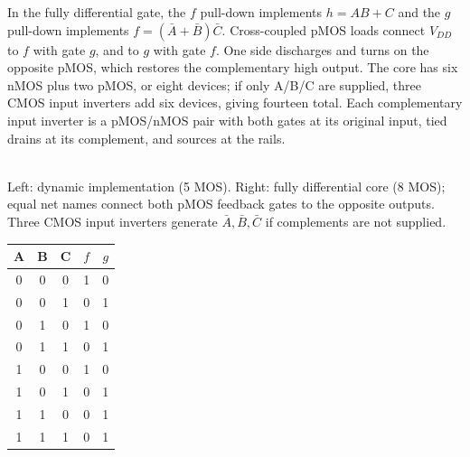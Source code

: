 \documentclass[10pt]{article}
\newcommand{\mos}[4]{\begin{scope}[shift={(#1,#2)}]
\draw(0,.24)--(0,-.24);\draw(0,.2)--(.25,.2)--(.25,.5);\draw(0,-.2)--(.25,-.2)--(.25,-.5);
\draw(-.16,.23)--(-.16,-.23);
\ifnum#4=1\draw(-.26,0)circle(.06);\draw(-.75,0)--(-.32,0);\else\draw(-.75,0)--(-.16,0);\fi
\node[anchor=east,font=\scriptsize]at(-.76,0){$#3$};\end{scope}}
\newcommand{\gnd}[2]{\draw(#1,#2)--(#1,{#2-.12});\draw({#1-.17},{#2-.12})--({#1+.17},{#2-.12});\draw({#1-.11},{#2-.2})--({#1+.11},{#2-.2});}
\newcommand{\rail}[3]{\draw(#1,#2)--(#1,{#2+.14});\node[above,font=\scriptsize]at(#1,{#2+.14}){$#3$};}
\begin{document}
In the fully differential gate, the $f$ pull-down implements $h=AB+C$ and the $g$ pull-down implements $f=(\bar A+\bar B)\bar C$. Cross-coupled pMOS loads connect $V_{DD}$ to $f$ with gate $g$, and to $g$ with gate $f$. One side discharges and turns on the opposite pMOS, which restores the complementary high output. The core has six nMOS plus two pMOS, or eight devices; if only A/B/C are supplied, three CMOS input inverters add six devices, giving fourteen total. Each complementary input inverter is a pMOS/nMOS pair with both gates at its original input, tied drains at its complement, and sources at the rails.
\begin{center}\hspace{1cm}\\Left: dynamic implementation (5 MOS). Right: fully differential core (8 MOS); equal net names connect both pMOS feedback gates to the opposite outputs. Three CMOS input inverters generate $\bar A,\bar B,\bar C$ if complements are not supplied.\end{center}
\begin{center}\begin{tabular}{ccc|cc}\toprule A&B&C&$f$&$g$\\\midrule
0&0&0&1&0\\0&0&1&0&1\\0&1&0&1&0\\0&1&1&0&1\\1&0&0&1&0\\1&0&1&0&1\\1&1&0&0&1\\1&1&1&0&1\\\bottomrule\end{tabular}\end{center}
\end{document}

